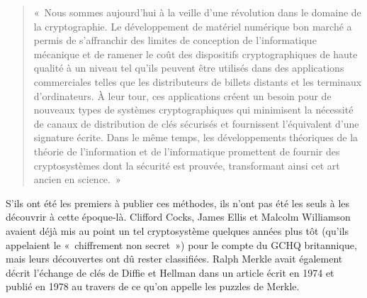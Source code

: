 \begin{quote}
«~Nous sommes aujourd'hui à la veille d'une révolution dans le domaine de la cryptographie. Le développement de matériel numérique bon marché a permis de s'affranchir des limites de conception de l'informatique mécanique et de ramener le coût des dispositifs cryptographiques de haute qualité à un niveau tel qu'ils peuvent être utilisés dans des applications commerciales telles que les distributeurs de billets distants et les terminaux d'ordinateurs. À leur tour, ces applications créent un besoin pour de nouveaux types de systèmes cryptographiques qui minimisent la nécessité de canaux de distribution de clés sécurisés et fournissent l'équivalent d'une signature écrite. Dans le même temps, les développements théoriques de la théorie de l'information et de l'informatique promettent de fournir des cryptosystèmes dont la sécurité est prouvée, transformant ainsi cet art ancien en science.~»
\end{quote} %

S'ils ont été les premiers à publier ces méthodes, ils n'ont pas été les seuls à les découvrir à cette époque-là. Clifford Cocks, James Ellis et Malcolm Williamson avaient déjà mis au point un tel cryptosystème quelques années plus tôt (qu'ils appelaient le «~chiffrement non secret~») pour le compte du GCHQ britannique, mais leurs découvertes ont dû rester classifiées. Ralph Merkle avait également décrit l'échange de clés de Diffie et Hellman dans un article écrit en 1974 et publié en 1978 au travers de ce qu'on appelle les puzzles de Merkle.

